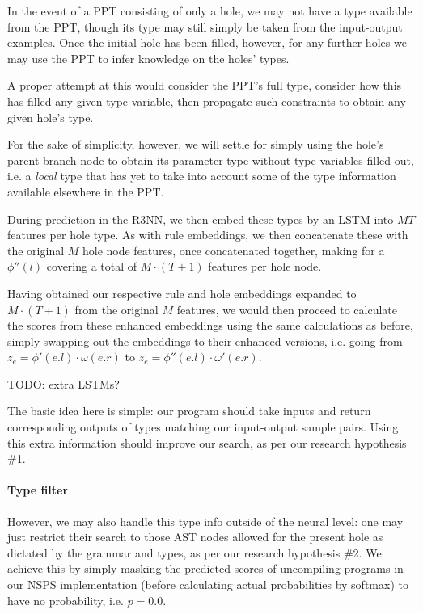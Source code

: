 \documentclass{article}
\begin{document}
\begin{itemize}
    In the event of a PPT consisting of only a hole,
    we may not have a type available from the PPT,
    though its type may still simply be taken from the input-output examples.
    Once the initial hole has been filled, however,
    for any further holes we may use the PPT to infer knowledge on the holes' types.

    A proper attempt at this would consider the PPT's full type,
    consider how this has filled any given type variable,
    then propagate such constraints to obtain any given hole's type.

    For the sake of simplicity, however, we will settle for simply using the hole's
    parent branch node to obtain its parameter type without type variables filled out,
    i.e. a \emph{local} type that has yet to take into account some of the type information available elsewhere in the PPT.

    During prediction in the R3NN, we then embed these types by an LSTM into $MT$ features per hole type.
    As with rule embeddings, we then concatenate these with the original $M$ hole node features,
    once concatenated together, making for a $\phi''(l)$ covering a total of $M \cdot (T+1)$ features per hole node.

\end{itemize}

Having obtained our respective rule and hole embeddings expanded to $M \cdot (T+1)$ from the original $M$ features,
we would then proceed to calculate the scores from these enhanced embeddings using the same calculations as before,
simply swapping out the embeddings to their enhanced versions,
i.e. going from $z_e = \phi'(e.l) \cdot \omega(e.r)$ to $z_e = \phi''(e.l) \cdot \omega'(e.r)$.

TODO: extra LSTMs?

The basic idea here is simple: our program should take inputs and return
corresponding outputs of types matching our input-output sample pairs.
Using this extra information should improve our search,
as per our research hypothesis \#1.

\paragraph{Type filter} \label{sec:filter}

However, we may also handle this type info outside of the neural level:
one may just restrict their search to those AST nodes allowed
for the present hole as dictated by the grammar and types,
as per our research hypothesis \#2.
We achieve this by simply masking the predicted scores of uncompiling programs in our NSPS implementation
(before calculating actual probabilities by softmax) to have no probability, i.e. $p=0.0$.
\end{document}
